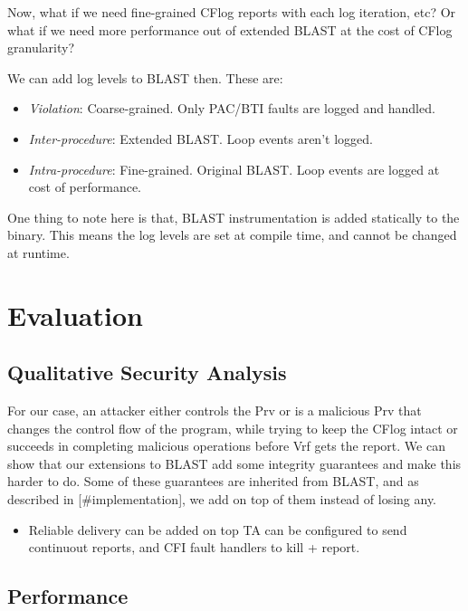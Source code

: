 \documentclass[a4paper, nobind]{templates/ociamthesis}
\providecommand{\tightlist}{%
  \setlength{\itemsep}{0pt}\setlength{\parskip}{0pt}}
\begin{document}
Now, what if we need fine-grained CFlog reports with each log iteration, etc?
Or what if we need more performance out of extended BLAST at the cost of CFlog granularity?

We can add log levels to BLAST then. These are:

\begin{itemize}
\tightlist
\item
  \emph{Violation}: Coarse-grained. Only PAC/BTI faults are logged and handled.
\item
  \emph{Inter-procedure}: Extended BLAST. Loop events aren't logged.
\item
  \emph{Intra-procedure}: Fine-grained. Original BLAST. Loop events are logged at cost of performance.
\end{itemize}

One thing to note here is that, BLAST instrumentation is added statically to the binary.
This means the log levels are set at compile time, and cannot be changed at runtime.

\chapter{Evaluation}\label{evaluation}

\minitoc 

\section{Qualitative Security Analysis}\label{qualitative-security-analysis}

For our case, an attacker either controls the Prv or is a malicious Prv that changes
the control flow of the program, while trying to keep the CFlog intact
or succeeds in completing malicious operations before Vrf gets the report.
We can show that our extensions to BLAST add some integrity guarantees and
make this harder to do. Some of these guarantees are inherited from BLAST, and
as described in {[}\#implementation{]}, we add on top of them instead of losing any.

\begin{itemize}
\tightlist
\item
  Reliable delivery can be added on top
  TA can be configured to send continuout reports, and CFI fault handlers to kill + report.
\end{itemize}

\section{Performance}\label{performance}
\end{document}
